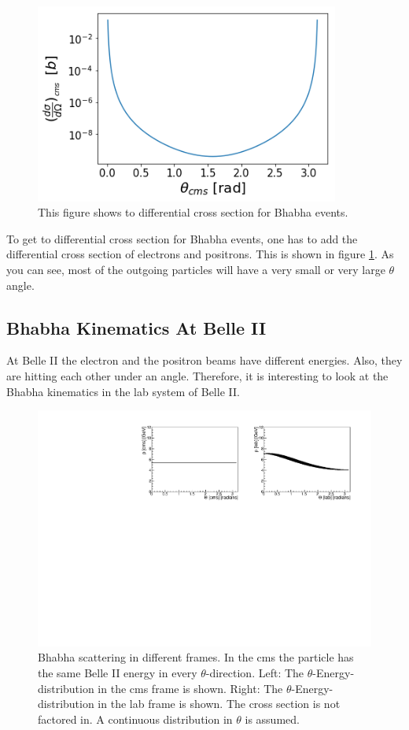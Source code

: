 \documentclass[a4paper,11pt,twosided,final,german,openbib,pdftex,listof=totoc,bibliography=totoc]{scrbook}
\begin{document}
\begin{figure}[h!]
	\centering
	\includegraphics[width=10cm]{Bilder/dsdOb}
	\caption[Differential Cross Section For Bhabha Events]{This figure shows to differential cross section for Bhabha events.}
	\label{fig:CrossSectionBoth}
\end{figure}

To get to differential cross section for Bhabha events, one has to add the differential cross section of electrons and positrons. This is shown in figure \ref{fig:CrossSectionBoth}. As you can see, most of the outgoing particles will have a very small or very large $\theta$ angle.


\subsection{Bhabha Kinematics At Belle II}
\label{sec:Kinematics}

At Belle II the electron and the positron beams have different energies. Also, they are hitting each other under an angle. Therefore, it is interesting to look at the Bhabha kinematics in the lab system of Belle II.

\begin{figure}[h!]
	\centering
\includegraphics[width=\textwidth]{Bilder/CThetaP}
	\caption[$\theta$-Energy-Distribution In The CMS And LAB Frame]{Bhabha scattering in different frames. In the cms the particle has the same Belle II energy in every $\theta$-direction. Left: The $\theta$-Energy-distribution in the cms frame is shown. Right: The $\theta$-Energy-distribution in the lab frame is shown. The cross section is not factored in. A continuous distribution in $\theta$ is assumed.}

\end{figure}
\end{document}
